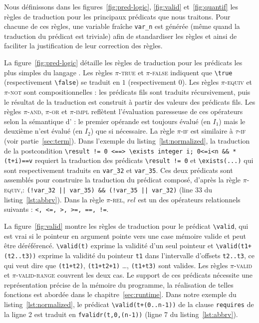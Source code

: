 Nous définissons dans les figures~\ref{fig:pred-logic}, \ref{fig:valid}
et~\ref{fig:quantif} les règles de traduction pour les principaux
prédicats \eacsl que nous traitons.
Pour chacune de ces règles, une variable fraîche \lstinline'var_n' est générée
(même quand la traduction du prédicat est triviale) afin de standardiser les
règles et ainsi de faciliter la justification de leur correction des règles.



La figure~\ref{fig:pred-logic} détaille les règles de traduction pour les
prédicats les plus simples du langage \eacsl.
Les règles \textsc{$\pi$-true} et \textsc{$\pi$-false} indiquent que
\lstinline'\true' (respectivement \lstinline'\false') se traduit en $1$
(respectivement $0$).
Les règles \textsc{$\pi$-equiv} et \textsc{$\pi$-not} sont compositionnelles :
les prédicats fils sont traduits récursivement, puis le résultat de la
traduction est construit à partir des valeurs des prédicats fils.
Les règles \textsc{$\pi$-and}, \textsc{$\pi$-or} et \textsc{$\pi$-impl}
reflètent l'évaluation paresseuse de ces opérateurs selon la sémantique d'\eacsl
: le premier opérande est toujours évalué (en $I_1$) mais le deuxième n'est
évalué (en $I_2$) que si nécessaire.
La règle \textsc{$\pi$-if} est similaire à \textsc{$\tau$-if} (voir
partie~\ref{sec:term}).
Dans l'exemple du listing~\ref{lst:normalized}, la traduction de la
postcondition
\lstinline{\result != 0 <==> \exists integer i; 0<=i<n && *(t+i)==v} requiert
la traduction des prédicats \lstinline'\result != 0' et
\lstinline{\exists(...)} qui sont respectivement traduits en \lstinline'var_32'
et \lstinline'var_35'.
Ces deux prédicats sont assemblés pour construire la traduction du prédicat
composé, d'après la règle \textsc{$\pi$-equiv},:
\lstinline'(!var_32 || var_35) && (!var_35 || var_32)' (line 33 du
listing~\ref{lst:abbrv}).
Dans la règle \textsc{$\pi$-rel}, $rel$ est un des opérateurs relationnels
suivants : \lstinline[style=c]'<, <=, >, >=, ==, !='.



La figure~\ref{fig:valid} montre les règles de traduction pour le prédicat
\lstinline'\valid', qui est vrai si le pointeur en argument pointe vers une
case mémoire valide et peut être déréférencé.
\lstinline'\valid(t)' exprime la validité d'un seul pointeur et
\lstinline'\valid(t1+(t2..t3))' exprime la validité du pointeur \lstinline't1'
dans l'intervalle d'offsets \lstinline't2..t3', ce qui veut dire que
\lstinline'(t1+t2)', \lstinline'(t1+t2+1)' \dots, \lstinline'(t1+t3)' sont
valides.
Les règles \textsc{$\pi$-valid} et \textsc{$\pi$-valid-range} couvrent les deux
cas.
Le support de ces prédicats nécessite une représentation précise de la mémoire
du programme, la réalisation de telles fonctions est abordée dans le
chapitre~\ref{sec:runtime}.
Dans notre exemple du listing~\ref{lst:normalized}, le prédicat
\lstinline'\valid(t+(0..n-1))' de la clause \lstinline'requires' de la ligne 2
est traduit en \lstinline[style=c]'fvalidr(t,0,(n-1))' (ligne 7 du
listing~\ref{lst:abbrv}).

